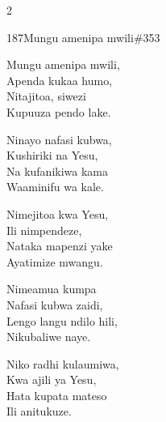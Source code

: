 \documentclass{article}
\begin{document}
\begin{multicols}{2}
\begin{hymn}{187}{Mungu amenipa mwili}{\#353}
\begin{stanza}
Mungu amenipa mwili,\\
Apenda kukaa humo,\\
Nitajitoa, siwezi\\
Kupuuza pendo lake.
\end{stanza}
\begin{chorus}
Ninayo nafasi kubwa,\\
Kushiriki na Yesu,\\
Na kufanikiwa kama\\
Waaminifu wa kale.
\end{chorus}
\begin{stanza}
Nimejitoa kwa Yesu,\\
Ili nimpendeze,\\
Nataka mapenzi yake\\
Ayatimize mwangu.
\end{stanza}
\begin{stanza}
Nimeamua kumpa\\
Nafasi kubwa zaidi,\\
Lengo langu ndilo hili,\\
Nikubaliwe naye.
\end{stanza}
\begin{stanza}
Niko radhi kulaumiwa,\\
Kwa ajili ya Yesu,\\
Hata kupata mateso\\
Ili anitukuze.
\end{stanza}
\end{hymn}


\end{multicols}
\end{document}
